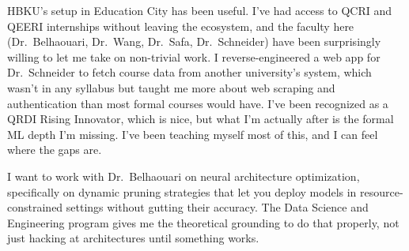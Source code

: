 \documentclass[11pt,a4paper]{article}
\begin{document}
HBKU's setup in Education City has been useful. I've had access to QCRI and QEERI internships without leaving the ecosystem, and the faculty here (Dr.\ Belhaouari, Dr.\ Wang, Dr.\ Safa, Dr.\ Schneider) have been surprisingly willing to let me take on non-trivial work. I reverse-engineered a web app for Dr.\ Schneider to fetch course data from another university's system, which wasn't in any syllabus but taught me more about web scraping and authentication than most formal courses would have. I've been recognized as a QRDI Rising Innovator, which is nice, but what I'm actually after is the formal ML depth I'm missing. I've been teaching myself most of this, and I can feel where the gaps are.

I want to work with Dr.\ Belhaouari on neural architecture optimization, specifically on dynamic pruning strategies that let you deploy models in resource-constrained settings without gutting their accuracy. The Data Science and Engineering program gives me the theoretical grounding to do that properly, not just hacking at architectures until something works.
\end{document}
